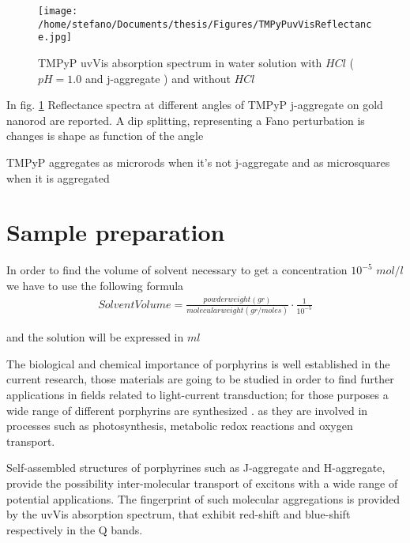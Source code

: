 \label{Chapter2} %




\begin{figure}[ht!]
	\centering %
		\texttt{[image: /home/stefano/Documents/thesis/Figures/TMPyPuvVisReflectance.jpg]}
	\caption{TMPyP uvVis absorption spectrum in water solution with $HCl$ ($pH = 1.0$ and j-aggregate ) and without $HCl$  }
	\label{fig:TMPyP_uvVis_Reflectance}
\end{figure}


In fig. \ref{fig:TMPyP_uvVis_Reflectance} Reflectance spectra at different angles of TMPyP j-aggregate on gold nanorod are reported. A dip splitting, representing a Fano perturbation is changes is shape as function of the angle

TMPyP aggregates as microrods when it's not j-aggregate and as microsquares when it is aggregated

\section{Sample preparation}

In order to find the volume of solvent necessary to get a concentration $10^{-5}$ $mol/l$ we have to use the following formula
\begin{eqnarray}
	Solvent Volume = \frac{powder weight (gr)}{molecular weight (gr/moles)}\cdot\frac{1}{10^{-5} }
\end{eqnarray}

and the solution will be expressed in $ml$


The biological and chemical importance of porphyrins is well established in the current research, those materials are going to be studied in order to find further applications in fields related to light-current transduction; for those purposes a wide range of different porphyrins are synthesized .
 as they are involved in processes such as photosynthesis, metabolic redox reactions and oxygen transport.
 
 Self-assembled structures of porphyrines such as J-aggregate and H-aggregate, provide the possibility inter-molecular transport of excitons with a wide range of potential applications. The fingerprint of such molecular aggregations is provided by the uvVis absorption spectrum, that exhibit red-shift and blue-shift respectively in the Q bands.
 
